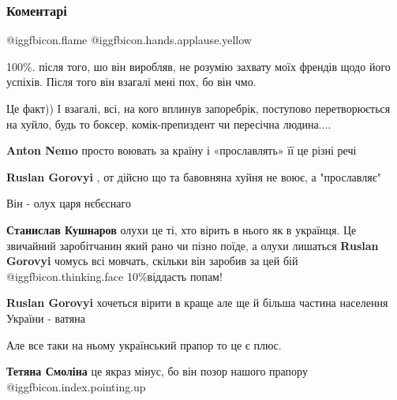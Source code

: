  
 
 
 
 
\subsubsection{Коментарі}

\begin{itemize} %
 @igg{fbicon.flame}  @igg{fbicon.hands.applause.yellow} 

100\%. після того, шо він виробляв, не розумію захвату моїх френдів щодо його
успіхів. Після того він взагалі мені пох, бо він чмо.


Це факт)) І взагалі, всі, на кого вплинув запоребрік, поступово перетворюється
на хуйло, будь то боксер, комік-препиздент чи пересічна людина....

\begin{itemize} %
\textbf{Anton Nemo} просто воювать за країну і «прославлять» її це різні речі

\textbf{Ruslan Gorovyi} , от дійсно що та бавовняна хуйня не воює, а "прославляє"
\end{itemize} %

Він - олух царя нєбєснаго

\begin{itemize} %
\textbf{Станислав Кушнаров} олухи це ті, хто вірить в нього як в українця. Це звичайний заробітчанин який рано чи пізно поїде, а олухи лишаться
\textbf{Ruslan Gorovyi} чомусь всі мовчать, скільки він заробив за цей бій @igg{fbicon.thinking.face} 10\%віддасть попам!

\textbf{Ruslan Gorovyi} хочеться вірити в краще але ще й більша частина населення України - ватяна

Але все таки на ньому український прапор то це є плюс.

\textbf{Тетяна Смоліна} це якраз мінус, бо він позор нашого прапору @igg{fbicon.index.pointing.up}


\end{itemize}
\end{itemize}
